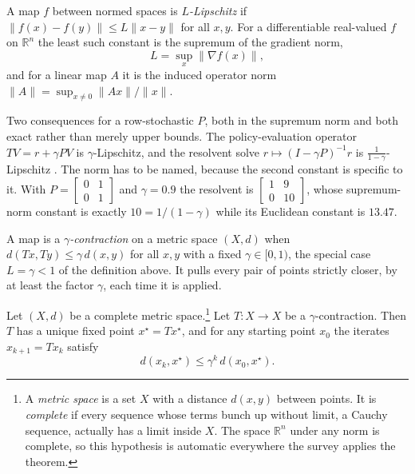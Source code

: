 \begin{theorem}
\label{thm:prelim_lipschitz}
A map $f$ between normed spaces is \emph{$L$-Lipschitz} if $\|f(x) - f(y)\| \leq L\|x - y\|$ for all $x, y$. For a differentiable real-valued $f$ on $\mathbb{R}^n$ the least such constant is the supremum of the gradient norm,
\begin{equation}
L = \sup_x \|\nabla f(x)\|,
\label{eq:prelim_lipschitz}
\end{equation}
and for a linear map $A$ it is the induced operator norm $\|A\| = \sup_{x \neq 0}\|Ax\| / \|x\|$.
\end{theorem}

Two consequences for a row-stochastic $P$, both in the supremum norm and both exact rather than merely upper bounds. The policy-evaluation operator $T V = r + \gamma P V$ is $\gamma$-Lipschitz, and the resolvent solve $r \mapsto (I - \gamma P)^{-1} r$ is $\tfrac{1}{1-\gamma}$-Lipschitz \citep{puterman1994}. The norm has to be named, because the second constant is specific to it. With $P = \left[\begin{smallmatrix} 0 & 1 \\ 0 & 1 \end{smallmatrix}\right]$ and $\gamma = 0.9$ the resolvent is $\left[\begin{smallmatrix} 1 & 9 \\ 0 & 10 \end{smallmatrix}\right]$, whose supremum-norm constant is exactly $10 = 1/(1-\gamma)$ while its Euclidean constant is $13.47$.

A map is a \emph{$\gamma$-contraction} on a metric space $(X,d)$ when $d(Tx, Ty) \leq \gamma\, d(x,y)$ for all $x, y$ with a fixed $\gamma \in [0,1)$, the special case $L = \gamma < 1$ of the definition above. It pulls every pair of points strictly closer, by at least the factor $\gamma$, each time it is applied.

\begin{theorem}
\label{thm:prelim_banach}
Let $(X, d)$ be a complete metric space.\footnote{A \emph{metric space} is a set $X$ with a distance $d(x,y)$ between points. It is \emph{complete} if every sequence whose terms bunch up without limit, a Cauchy sequence, actually has a limit inside $X$. The space $\mathbb{R}^n$ under any norm is complete, so this hypothesis is automatic everywhere the survey applies the theorem.} Let $T : X \to X$ be a $\gamma$-contraction. Then $T$ has a unique fixed point $x^\star = Tx^\star$, and for any starting point $x_0$ the iterates $x_{k+1} = Tx_k$ satisfy
\begin{equation}
d(x_k, x^\star) \leq \gamma^k\, d(x_0, x^\star).
\label{eq:prelim_banach_rate}
\end{equation}
\end{theorem}

